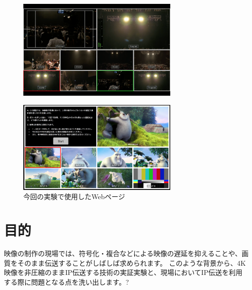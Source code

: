 \begin{figure}[htbp]
  \begin{center}
    \includegraphics[bb=0 0 1680 1050,width=8cm]{img/mv-delay-actual.png}
  \end{center}
  \caption{}
  \label{fig:ted-4k-fmc-card}
\end{figure}
\begin{figure}[htbp]
  \begin{center}
    \includegraphics[bb=0 0 1294 750,width=8cm]{img/mv-delay-virtual.png}
  \end{center}
  \caption{今回の実験で使用したWebページ}
  \label{fig:ted-4k-fmc-card}
\end{figure}

\section{目的}

映像の制作の現場では、符号化・複合などによる映像の遅延を抑えることや、画質をそのまま伝送することがしばしば求められます。
このような背景から、4K映像を非圧縮のままIP伝送する技術の実証実験と、現場においてIP伝送を利用する際に問題となる点を洗い出します。?

